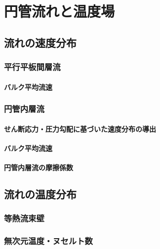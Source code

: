 \documentclass[uplatex,12pt]{jsbook}
\begin{document}
	\chapter{円管流れと温度場}
	\section{流れの速度分布}
	\subsection{平行平板間層流}
	\subsubsection{バルク平均流速}
	
	\subsection{円管内層流}
	\subsubsection{せん断応力・圧力勾配に基づいた速度分布の導出}
	\subsubsection{バルク平均流速}
	\subsubsection{円管内層流の摩擦係数}
	
	\section{流れの温度分布}
	\subsection{等熱流束壁}
	\subsection{無次元温度・ヌセルト数}
	
\printindex
\end{document}
